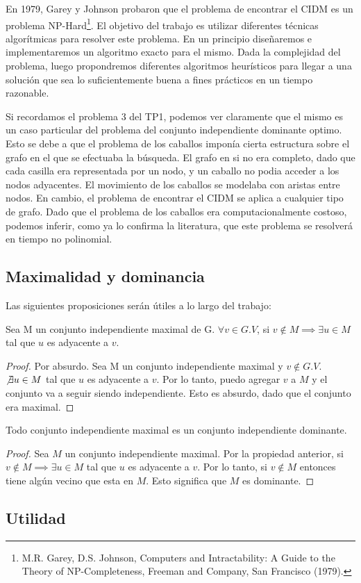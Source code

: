 En 1979, Garey y Johnson probaron que el problema de encontrar el CIDM es un problema NP-Hard\footnote{M.R. Garey, D.S. Johnson, Computers and Intractability: A Guide to the Theory of NP-Completeness, Freeman and Company, San Francisco (1979).}.
El objetivo del trabajo es utilizar diferentes técnicas algorítmicas para resolver este problema. En un principio diseñaremos e implementaremos un algoritmo exacto para el mismo. Dada la complejidad del problema, luego propondremos diferentes algoritmos heurísticos para llegar a una solución que sea lo suficientemente buena a fines prácticos en un tiempo razonable.

Si recordamos el problema 3 del TP1, podemos ver claramente que el mismo es un caso particular del problema del conjunto independiente dominante optimo. Esto se debe a que el problema de los caballos imponía cierta estructura sobre el grafo en el que se efectuaba la búsqueda. El grafo en si no era completo, dado que cada casilla era representada por un nodo, y un caballo no podia acceder a los nodos adyacentes. El movimiento de los caballos se modelaba con aristas entre nodos. En cambio, el problema de encontrar el CIDM se aplica a cualquier tipo de grafo. Dado que el problema de los caballos era computacionalmente costoso, podemos inferir, como ya lo confirma la literatura, que este problema se resolverá en tiempo no polinomial.

\subsection{Maximalidad y dominancia}

Las siguientes proposiciones serán útiles a lo largo del trabajo:

\begin{proposition}
Sea M un conjunto independiente maximal de G. $\forall v \in G.V$, si $v \notin M \implies \exists u \in M$ tal que $u$ es adyacente a $v$. 
\end{proposition}

\begin{proof}
Por absurdo. Sea M un conjunto independiente maximal y $v \notin G.V$. $\not\exists u \in M$ tal que $u$ es adyacente a $v$. Por lo tanto, puedo agregar $v$ a $M$ y el conjunto va a seguir siendo independiente. Esto es absurdo, dado que el conjunto era maximal.
\end{proof}

\begin{proposition}
Todo conjunto independiente maximal es un conjunto independiente dominante.
\end{proposition}

\begin{proof}
Sea $M$ un conjunto independiente maximal. Por la propiedad anterior, si $v \notin M \implies \exists u \in M$ tal que $u$ es adyacente a $v$. Por lo tanto, si $v \notin M$ entonces tiene algún vecino que esta en $M$. Esto significa que $M$ es dominante.
\end{proof}

\newpage

\subsection{Utilidad}